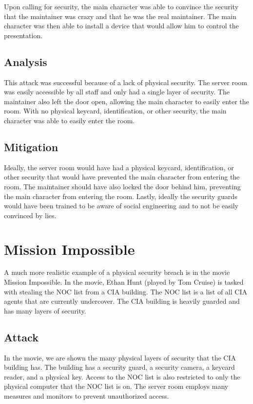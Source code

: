 \documentclass[acmlarge]{acmart}
\begin{document}
Upon calling for security, the main character was able to convince the security that the
maintainer was crazy and that he was the real maintainer. The main character was then able
to install a device that would allow him to control the presentation.

\subsection{Analysis}
This attack was successful because of a lack of physical security. The server room was
easily accessible by all staff and only had a single layer of security. The maintainer
also left the door open, allowing the main character to easily enter the room.
With no physical keycard, identification, or other security, the main character was
able to easily enter the room.

\subsection{Mitigation}
Ideally, the server room would have had a physical keycard, identification, or other
security that would have prevented the main character from entering the room. The
maintainer should have also locked the door behind him, preventing the main character
from entering the room. Lastly, ideally the security guards would have been trained
to be aware of social engineering and to not be easily convinced by lies.

\section{Mission Impossible}
A much more realistic example of a physical security breach is in the movie
Mission Impossible. In the movie, Ethan Hunt (played by Tom Cruise) is tasked
with stealing the NOC list from a CIA building. The NOC list is a list of all
CIA agents that are currently undercover. The CIA building is heavily guarded
and has many layers of security.

\subsection{Attack}
In the movie, we are shown the many physical layers of security that the CIA
building has. The building has a security guard, a security camera, a keycard
reader, and a physical key. Access to the NOC list is also restricted to only
the physical computer that the NOC list is on. The server room employs many
measures and monitors to prevent unauthorized access.
\end{document}
